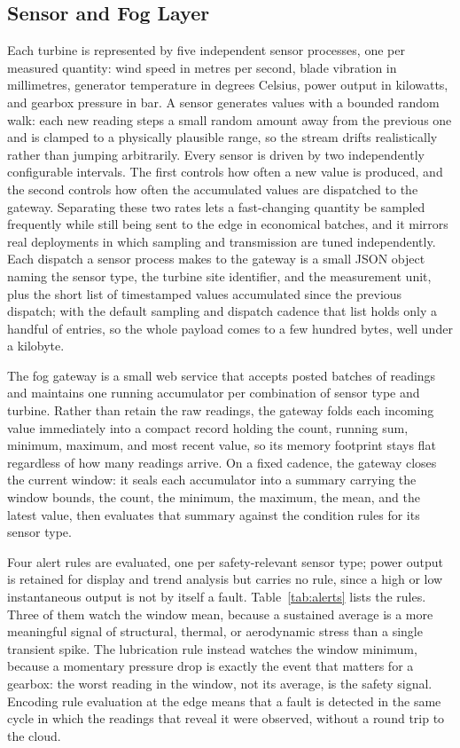 \documentclass[conference]{IEEEtran}
\begin{document}
\subsection{Sensor and Fog Layer}

Each turbine is represented by five independent sensor processes, one per measured quantity: wind speed in metres per second, blade vibration in millimetres, generator temperature in degrees Celsius, power output in kilowatts, and gearbox pressure in bar. A sensor generates values with a bounded random walk: each new reading steps a small random amount away from the previous one and is clamped to a physically plausible range, so the stream drifts realistically rather than jumping arbitrarily. Every sensor is driven by two independently configurable intervals. The first controls how often a new value is produced, and the second controls how often the accumulated values are dispatched to the gateway. Separating these two rates lets a fast-changing quantity be sampled frequently while still being sent to the edge in economical batches, and it mirrors real deployments in which sampling and transmission are tuned independently. Each dispatch a sensor process makes to the gateway is a small JSON object naming the sensor type, the turbine site identifier, and the measurement unit, plus the short list of timestamped values accumulated since the previous dispatch; with the default sampling and dispatch cadence that list holds only a handful of entries, so the whole payload comes to a few hundred bytes, well under a kilobyte.

The fog gateway is a small web service that accepts posted batches of readings and maintains one running accumulator per combination of sensor type and turbine. Rather than retain the raw readings, the gateway folds each incoming value immediately into a compact record holding the count, running sum, minimum, maximum, and most recent value, so its memory footprint stays flat regardless of how many readings arrive. On a fixed cadence, the gateway closes the current window: it seals each accumulator into a summary carrying the window bounds, the count, the minimum, the maximum, the mean, and the latest value, then evaluates that summary against the condition rules for its sensor type.

Four alert rules are evaluated, one per safety-relevant sensor type; power output is retained for display and trend analysis but carries no rule, since a high or low instantaneous output is not by itself a fault. Table~\ref{tab:alerts} lists the rules. Three of them watch the window mean, because a sustained average is a more meaningful signal of structural, thermal, or aerodynamic stress than a single transient spike. The lubrication rule instead watches the window minimum, because a momentary pressure drop is exactly the event that matters for a gearbox: the worst reading in the window, not its average, is the safety signal. Encoding rule evaluation at the edge means that a fault is detected in the same cycle in which the readings that reveal it were observed, without a round trip to the cloud.
\end{document}
